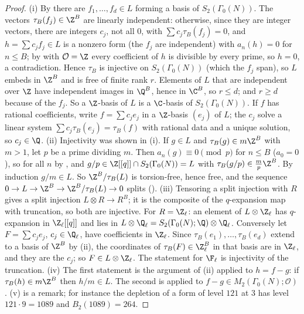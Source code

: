 \begin{proof}
(i) By  there are $f_1,\dots,f_d\in L$ forming a basis of $S_2(\Gamma_0(N))$. The vectors $\tau_B(f_j)\in\Z^B$ are linearly independent: otherwise, since they are
integer vectors, there are integers $c_j$, not all $0$, with $\sum c_j\tau_B(f_j)=0$, and $h=\sum c_jf_j\in L$ is a nonzero form (the $f_j$ are independent) with $a_n(h)=0$ for $n\le B$;
by  with $\mathcal O=\Z$ every coefficient of $h$ is divisible by every prime, so $h=0$, a contradiction. Hence $\tau_B$ is injective on $S_2(\Gamma_0(N))$ (which
the $f_j$ span), so $L$ embeds in $\Z^B$ and is free of finite rank $r$. Elements of $L$ that are independent over $\Z$ have independent images in $\Q^B$, hence in $\C^B$, so $r\le d$; and
$r\ge d$ because of the $f_j$. So a $\Z$-basis of $L$ is a $\C$-basis of $S_2(\Gamma_0(N))$. If $f$ has rational coefficients, write $f=\sum c_je_j$ in a $\Z$-basis $(e_j)$ of $L$; the $c_j$
solve a linear system $\sum c_j\tau_B(e_j)=\tau_B(f)$ with rational data and a unique solution, so $c_j\in\Q$.
(ii) Injectivity was shown in (i). If $g\in L$ and $\tau_B(g)\in m\Z^B$ with $m>1$, let $p$ be a prime dividing $m$. Then $a_n(g)\equiv0\pmod p$ for $n\le B$ ($a_0=0$), so for all $n$ by
, and $g/p\in\Z[[q]]\cap S_2(\Gamma_0(N))=L$ with $\tau_B(g/p)\in\frac mp\Z^B$. By induction $g/m\in L$. So $\Z^B/\tau_B(L)$ is torsion-free, hence free, and the sequence
$0\to L\to\Z^B\to\Z^B/\tau_B(L)\to0$ splits ().
(iii) Tensoring a split injection with $R$ gives a split injection $L\otimes R\to R^B$; it is the composite of the $q$-expansion map with truncation, so both are injective. For $R=\Z_\ell$:
an element of $L\otimes\Z_\ell$ has $q$-expansion in $\Z_\ell[[q]]$ and lies in $L\otimes\Q_\ell=S_2(\Gamma_0(N);\Q)\otimes\Q_\ell$. Conversely let $F=\sum c_je_j$, $c_j\in\Q_\ell$, have coefficients in
$\Z_\ell$. Since $\tau_B(e_1),\dots,\tau_B(e_d)$ extend to a basis of $\Z^B$ by (ii), the coordinates of $\tau_B(F)\in\Z_\ell^B$ in that basis are in $\Z_\ell$, and they are the $c_j$; so
$F\in L\otimes\Z_\ell$. The statement for $\F_\ell$ is injectivity of the truncation.
(iv) The first statement is the argument of (ii) applied to $h=f-g$: if $\tau_B(h)\in m\Z^B$ then $h/m\in L$. The second is  applied to $f-g\in M_2(\Gamma_0(N);\mathcal O)$.
(v) is a remark; for instance the depletion of a form of level $121$ at $3$ has level $121\cdot9=1089$ and $B_2(1089)=264$.
\end{proof}

